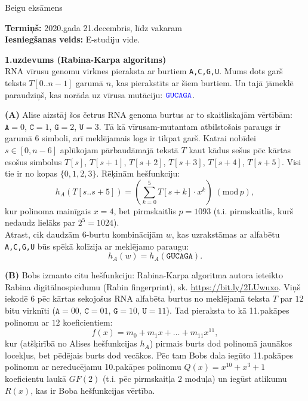 \documentclass[a4paper]{article}
\begin{document}
\twocolumn


\begin{center}
{\Large Beigu eksāmens}
\end{center}


{\bf Termiņš:} 2020.gada 21.decembris, līdz vakaram\\
{\bf Iesniegšanas veids:} E-studiju vide.

\vspace{5pt}
{\bf 1.uzdevums (Rabina-Karpa algoritms)}\\
RNA vīrusu genomu virknes pieraksta ar burtiem {\tt A,C,G,U}.
Mums dots garš teksts $T[0..n-1]$ garumā $n$, kas pierakstīts ar 
šiem burtiem. Un tajā jāmeklē paraudziņš, kas norāda uz 
vīrusa mutāciju: $\textcolor{blue}{\mathtt{GUCAGA}}$. 

\vspace{5pt}
{\bf (A)} Alise aizstāj šos četrus RNA genoma burtus ar to skaitliskajām 
vērtībām: $\mathtt{A} = 0$, $\mathtt{C} = 1$, $\mathtt{G} = 2$, 
$\mathtt{U} = 3$. Tā kā vīrusam-mutantam atbilstošais paraugs ir garumā $6$ simboli, 
arī meklējamais logs ir tikpat garš. Katrai nobīdei $s \in [0,n-6]$ 
aplūkojam pārbaudāmajā tekstā $T$ kaut kādus sešus pēc kārtas esošus simbolus 
$T[s]$, $T[s+1]$, $T[s+2]$, $T[s+3]$, $T[s+4]$, $T[s+5]$. 
Visi tie ir no kopas $\{ 0,1,2,3 \}$. Rēķinām hešfunkciju: 
$$h_A(T[s..s+5]) = \left( \sum\limits_{k=0}^{5} T[s+k] \cdot x^k \right)\;(\text{mod}\,p),$$
kur polinoma mainīgais $x = 4$, bet pirmskaitlis $p = 1093$
(t.i. pirmskaitlis, kurš nedaudz lielāks par $2^5 = 1024$).\\


Atrast, cik daudzām $6$-burtu kombinācijām $w$, kas uzrakstāmas ar 
alfabētu {\tt A,C,G,U} būs spēkā kolīzija ar meklējamo paraugu:
$$h_A(w) = h_A(\mathtt{GUCAGA}).$$



\vspace{5pt}
{\bf (B)}
Bobs izmanto citu hešfunkciju: Rabina-Karpa algoritma 
autora ieteikto Rabina digitālnospiedumu 
(Rabin fingerprint), sk. \url{https://bit.ly/2LUwuxo}. 
Viņš iekodē $6$ pēc kārtas sekojošus RNA alfabēta burtus no 
meklējamā teksta $T$ par $12$ bitu virknīti
($\mathtt{A} = 00$, $\mathtt{C} = 01$, $\mathtt{G} = 10$, $\mathtt{U} = 11$). 
Tad pieraksta to kā 11.pakāpes polinomu ar $12$ koeficientiem: 
$$f(x) = m_0 + m_1 x + \ldots + m_{11} x^{11},$$
kur (atšķirībā no Alises hešfunkcijas $h_A$) pirmais burts dod polinomā jaunākos 
locekļus, bet pēdējais burts dod vecākos. 
Pēc tam Bobs dala iegūto 11.pakāpes polinomu ar nereducējamu 
10.pakāpes polinomu $Q(x) = x^{10} + x^3 + 1$ koeficientu laukā $GF(2)$
(t.i. pēc pirmskaitļa $2$ moduļa) un iegūst atlikumu 
$R(x)$, kas ir Boba hešfunkcijas vērtība. 
\end{document}
